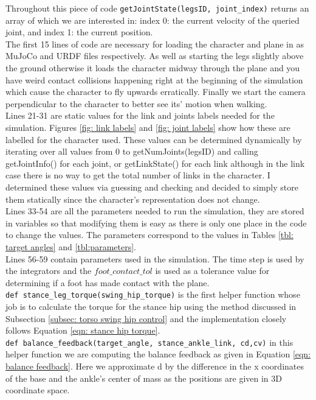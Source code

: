 \documentclass[12pt, a4paper]{article}
\begin{document}
Throughout this piece of code \verb;getJointState(legsID, joint_index); returns an array of which we are interested in: index 0: the current velocity of the queried joint, and index 1: the current position.\\

The first 15 lines of code are necessary for loading the character and plane in as MuJoCo and URDF files respectively. As well as starting the legs slightly above the ground otherwise it loads the character midway through the plane and you have weird contact collisions happening right at the beginning of the simulation which cause the character to fly upwards erratically. Finally we start the camera perpendicular to the character to better see its' motion when walking.\\

Lines 21-31 are static values for the link and joints labels needed for the simulation. Figures \ref{fig: link labels} and \ref{fig: joint labels} show how these are labelled for the character used. These values can be determined dynamically by iterating over all values from 0 to getNumJoints(legsID) and calling getJointInfo() for each joint, or getLinkState() for each link although in the link case there is no way to get the total number of links in the character. I determined these values via guessing and checking and decided to simply store them statically since the character's representation does not change. \\

Lines 33-54 are all the parameters needed to run the simulation, they are stored in variables so that modifying them is easy as there is only one place in the code to change the values. The parameters correspond to the values in Tables \ref{tbl: target angles} and \ref{tbl:parameters}.\\

Lines 56-59 contain parameters used in the simulation. The time step is used by the integrators and the $foot\_contact\_tol$ is used as a tolerance value for determining if a foot has made contact with the plane.\\

\verb;def stance_leg_torque(swing_hip_torque); is the first helper function whose job is to calculate the torque for the stance hip using the method discussed in Subsection \ref{subsec: torso swing hip control} and the implementation closely follows Equation \ref{eqn: stance hip torque}. \\

\verb;def balance_feedback(target_angle, stance_ankle_link, cd,cv); in this helper function we are computing the balance feedback as given in Equation \ref{eqn: balance feedback}. Here we approximate d by the difference in the x coordinates of the base and the ankle's center of mass as the positions are given in 3D coordinate space. \\
\end{document}
